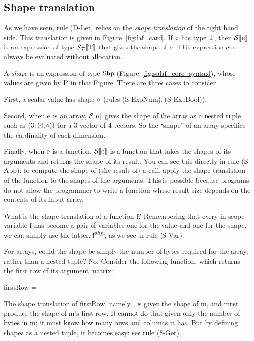 \subsection{Shape translation}
\label{sec:card}\label{sec:shapetrans}



As we have seen, rule (D-Let) relies on the \emph{shape translation} of the right
hand side.  This translation is given in Figure~\ref{fig:laf_card}.
If $\text{e}$ has type $\textnormal{T}$, then $\text{$\mathcal{S}\llbracket$\text{e}$\rrbracket$}$ is an expression 
of type $\text{$\mathcal{S_T}\llbracket$\textnormal{T}$\rrbracket$}$ that gives the shape of $\text{e}$.
This expression can always be evaluated without allocation.

A \emph{shape} is an expression of type $\textnormal{Shp}{}$ (Figure~\ref{fig:salaf_core_syntax}),
whose values are given by $\text{P}$ in that Figure.  There are three cases to consider

First, a scalar value has shape $\text{$\circ$}$ (rules (S-ExpNum), (S-ExpBool)).

Second, when $\text{e}$ is an array, $\text{$\mathcal{S}\llbracket$\text{e}$\rrbracket$}$ gives the shape of the array as
a nested tuple, such as $(3,(4,\text{$\circ$}))$ for a 3-vector of 4-vectors.
So the ``shape'' of an array specifies the cardinality of each dimension.

Finally, when $\text{e}$ is a function, $\text{$\mathcal{S}\llbracket$\text{e}$\rrbracket$}$ is a function that takes the shapes of its arguments and returns the shape of its result. 
You can see this directly in rule (S-App): to compute the shape of (the result of) a call, apply the shape-translation of the function to the shapes of the arguments.
This is possible because \lafsharp{} programs do not allow the programmer
to write a function whose result size depends on the contents of its input array.

What is the shape-translation of a function $\text{f}$?  Remembering that every in-scope variable $\text{f}$ has become a pair of variables one for the value and one for the shape, we can simply use the latter, $\text{$\text{\text{f}}^{shp}$}$, as we see in rule (S-Var).

For arrays, could the shape be simply the number of bytes required for the array,
rather than a nested tuple?  No.
Consider the following function, which returns the first row of its argument matrix:

firstRow = 

The shape translation of firstRow, namely , is given the shape of m, and must produce the
shape of m's first row.  It cannot do that given only the number of bytes in m; it must know how many rows
and columns it has.  But by defining shapes as a nested tuple, it becomes easy: see rule (S-Get).

